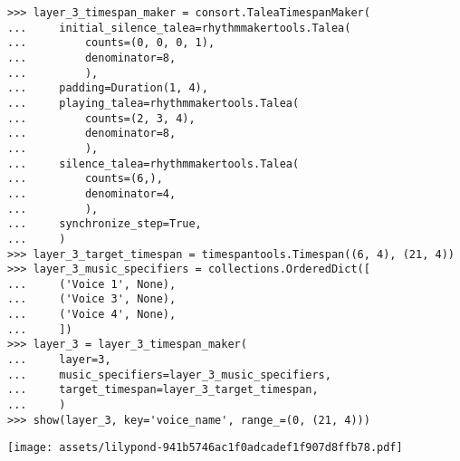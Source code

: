 \begin{comment}
<abjad>
layer_3_timespan_maker = consort.TaleaTimespanMaker(
    initial_silence_talea=rhythmmakertools.Talea(
        counts=(0, 0, 0, 1),
        denominator=8,
        ),
    padding=Duration(1, 4),
    playing_talea=rhythmmakertools.Talea(
        counts=(2, 3, 4),
        denominator=8,
        ),
    silence_talea=rhythmmakertools.Talea(
        counts=(6,),
        denominator=4,
        ),
    synchronize_step=True,
    )
layer_3_target_timespan = timespantools.Timespan((6, 4), (21, 4))
layer_3_music_specifiers = collections.OrderedDict([
    ('Voice 1', None),
    ('Voice 3', None),
    ('Voice 4', None),
    ])
layer_3 = layer_3_timespan_maker(
    layer=3,
    music_specifiers=layer_3_music_specifiers,
    target_timespan=layer_3_target_timespan,
    )
show(layer_3, key='voice_name', range_=(0, (21, 4)))
</abjad>
\end{comment}

\begin{singlespacing}
\vspace{-0.5\baselineskip}
\begin{lstlisting}
>>> layer_3_timespan_maker = consort.TaleaTimespanMaker(
...     initial_silence_talea=rhythmmakertools.Talea(
...         counts=(0, 0, 0, 1),
...         denominator=8,
...         ),
...     padding=Duration(1, 4),
...     playing_talea=rhythmmakertools.Talea(
...         counts=(2, 3, 4),
...         denominator=8,
...         ),
...     silence_talea=rhythmmakertools.Talea(
...         counts=(6,),
...         denominator=4,
...         ),
...     synchronize_step=True,
...     )
>>> layer_3_target_timespan = timespantools.Timespan((6, 4), (21, 4))
>>> layer_3_music_specifiers = collections.OrderedDict([
...     ('Voice 1', None),
...     ('Voice 3', None),
...     ('Voice 4', None),
...     ])
>>> layer_3 = layer_3_timespan_maker(
...     layer=3,
...     music_specifiers=layer_3_music_specifiers,
...     target_timespan=layer_3_target_timespan,
...     )
>>> show(layer_3, key='voice_name', range_=(0, (21, 4)))
\end{lstlisting}
\noindent\texttt{[image: assets/lilypond-941b5746ac1f0adcadef1f907d8ffb78.pdf]}
\end{singlespacing}

\begin{comment}
<abjad>
timespan_makers = (
    layer_1_timespan_maker,
    layer_2_timespan_maker,
    layer_3_timespan_maker,
    )
music_specifiers = (
    layer_1_music_specifiers,
    layer_2_music_specifiers,
    layer_3_music_specifiers,
    )
target_timespans = (
    layer_1_target_timespan,
    layer_2_target_timespan,
    layer_3_target_timespan,
    )
triples = zip(timespan_makers, music_specifiers, target_timespans)
timespan_inventory = timespantools.TimespanInventory()
for layer, triple in enumerate(triples, 1):
    timespan_inventory = triple[0](
        layer=layer,
        music_specifiers=triple[1],
        target_timespan=triple[2],
        timespan_inventory=timespan_inventory,
        )

show(timespan_inventory, key='voice_name', range_=(0, (21, 4)))
</abjad>
\end{comment}

